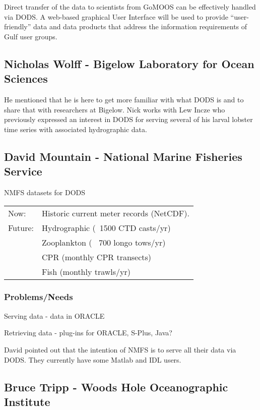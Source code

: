 Direct transfer of the data to scientists from GoMOOS can be
effectively handled via DODS. A web-based graphical User Interface
will be used to provide ``user-friendly'' data and data products that
address the information requirements of Gulf user groups.


\subsection{Nicholas Wolff -  Bigelow Laboratory for Ocean Sciences}

He mentioned that he is here to get more familiar with what DODS is
and to share that with researchers at Bigelow.  Nick works with Lew
Incze who previously expressed an interest in DODS for serving several
of his larval lobster time series with associated hydrographic data.


\subsection{David Mountain - National Marine Fisheries Service}

NMFS datasets for DODS

\begin{tabular}[t]{ll}
Now:&   Historic current meter records (NetCDF). \\
Future: & Hydrographic  (~1500 CTD casts/yr) \\
&       Zooplankton     (~ 700 longo tows/yr) \\
&       CPR             (monthly CPR transects) \\
&       Fish            (monthly trawls/yr) \\
\end{tabular}

\subsubsection{Problems/Needs}

Serving data - data in ORACLE

Retrieving data - plug-ins for ORACLE, S-Plus, Java?

David pointed out that the intention of NMFS is to serve all their
data via DODS.  They currently have some Matlab and IDL users.

\subsection{Bruce Tripp - Woods Hole Oceanographic Institute}

